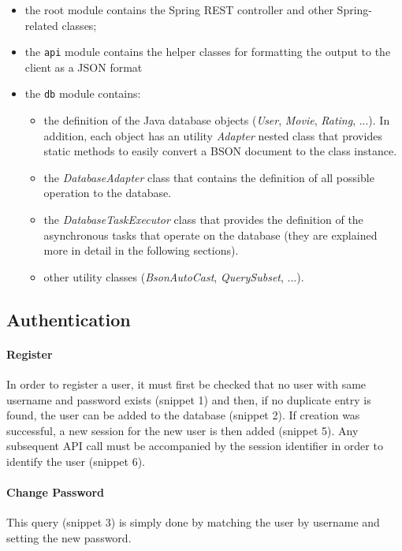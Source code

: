 \documentclass[11pt]{article}
\begin{document}
\begin{itemize}
	\item the root module contains the Spring REST controller and other Spring-related classes;
	\item the \texttt{api} module contains the helper classes for formatting the output to the client as a JSON format
	\item the \texttt{db} module contains:
	\begin{itemize}
		\item the definition of the Java database objects (\emph{User}, \emph{Movie}, \emph{Rating}, ...). In addition, each object has an utility \emph{Adapter} nested class that provides static methods to easily convert a BSON document to the class instance.
		\item the \emph{DatabaseAdapter} class that contains the definition of all possible operation to the database.
		\item the \emph{DatabaseTaskExecutor} class that provides the definition of the asynchronous tasks that operate on the database (they are explained more in detail in the following sections).
		\item other utility classes (\emph{BsonAutoCast}, \emph{QuerySubset}, ...).
	\end{itemize}
\end{itemize}

\subsection{Authentication}

\paragraph{Register}
In order to register a user, it must first be checked that no user with same username and password exists (snippet 1) and then, if no duplicate entry is found, the user can be added to the database (snippet 2). If creation was successful, a new session for the new user is then added (snippet 5). Any subsequent API call must be accompanied by the session identifier in order to identify the user (snippet 6).

\paragraph{Change Password}
This query (snippet 3) is simply done by matching the user by username and setting the new password.
\end{document}
